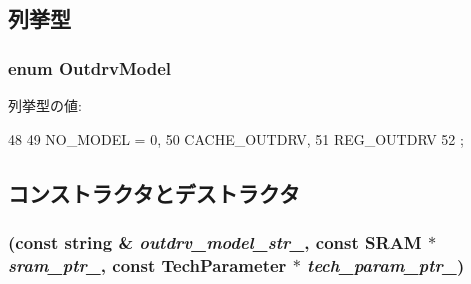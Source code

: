 \subsection{列挙型}
\hypertarget{classOutdrvUnit_acf5fc301c3542e694b0cec063a8d92c5}{
\subsubsection[{OutdrvModel}]{\setlength{\rightskip}{0pt plus 5cm}enum {\bf OutdrvModel}}}
\label{classOutdrvUnit_acf5fc301c3542e694b0cec063a8d92c5}
\begin{Desc}
\item[列挙型の値: ]\par
\begin{description}
\item[{\em 
\hypertarget{classOutdrvUnit_acf5fc301c3542e694b0cec063a8d92c5abab57b6e2c553e4d983f415a1f4ea75b}{
NO\_\-MODEL}
\label{classOutdrvUnit_acf5fc301c3542e694b0cec063a8d92c5abab57b6e2c553e4d983f415a1f4ea75b}
}]\item[{\em 
\hypertarget{classOutdrvUnit_acf5fc301c3542e694b0cec063a8d92c5a3df5c379101c3477a485f8ba66b8b0d9}{
CACHE\_\-OUTDRV}
\label{classOutdrvUnit_acf5fc301c3542e694b0cec063a8d92c5a3df5c379101c3477a485f8ba66b8b0d9}
}]\item[{\em 
\hypertarget{classOutdrvUnit_acf5fc301c3542e694b0cec063a8d92c5a2255e429b4b343fb912571ab95335e89}{
REG\_\-OUTDRV}
\label{classOutdrvUnit_acf5fc301c3542e694b0cec063a8d92c5a2255e429b4b343fb912571ab95335e89}
}]\end{description}
\end{Desc}




\begin{DoxyCode}
48     {
49       NO_MODEL = 0,
50       CACHE_OUTDRV,
51       REG_OUTDRV
52     };
\end{DoxyCode}


\subsection{コンストラクタとデストラクタ}
\hypertarget{classOutdrvUnit_a4f6cb5a4cdeb7f2641aafac67261694d}{
\subsubsection[{OutdrvUnit}]{ (const string \& {\em outdrv\_\-model\_\-str\_\-}, \/  const {\bf SRAM} $\ast$ {\em sram\_\-ptr\_\-}, \/  const {\bf TechParameter} $\ast$ {\em tech\_\-param\_\-ptr\_\-})}}
\label{classOutdrvUnit_a4f6cb5a4cdeb7f2641aafac67261694d}



